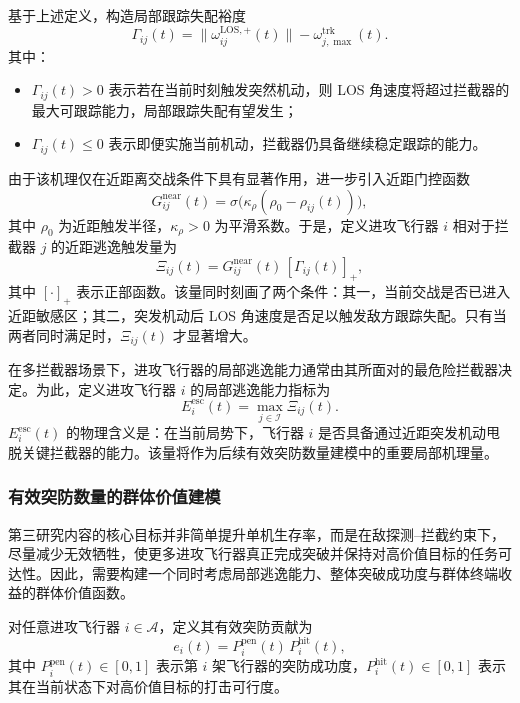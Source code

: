 基于上述定义，构造局部跟踪失配裕度
\begin{equation}
\Gamma_{ij}(t)
=
\|\omega_{ij}^{\mathrm{LOS},+}(t)\|
-
\omega_{j,\max}^{\mathrm{trk}}(t).
\end{equation}
其中：

\begin{itemize}
  \item $\Gamma_{ij}(t)>0$ 表示若在当前时刻触发突然机动，则 LOS 角速度将超过拦截器的最大可跟踪能力，局部跟踪失配有望发生；
  \item $\Gamma_{ij}(t)\le 0$ 表示即便实施当前机动，拦截器仍具备继续稳定跟踪的能力。
\end{itemize}

由于该机理仅在近距离交战条件下具有显著作用，进一步引入近距门控函数
\begin{equation}
G_{ij}^{\mathrm{near}}(t)
=
\sigma\!\bigl(\kappa_{\rho}(\rho_0-\rho_{ij}(t))\bigr),
\end{equation}
其中 $\rho_0$ 为近距触发半径，$\kappa_{\rho}>0$ 为平滑系数。于是，定义进攻飞行器 $i$ 相对于拦截器 $j$ 的近距逃逸触发量为
\begin{equation}
\Xi_{ij}(t)
=
G_{ij}^{\mathrm{near}}(t)\,[\Gamma_{ij}(t)]_+,
\end{equation}
其中 $[\cdot]_+$ 表示正部函数。该量同时刻画了两个条件：其一，当前交战是否已进入近距敏感区；其二，突发机动后 LOS 角速度是否足以触发敌方跟踪失配。只有当两者同时满足时，$\Xi_{ij}(t)$ 才显著增大。

在多拦截器场景下，进攻飞行器的局部逃逸能力通常由其所面对的最危险拦截器决定。为此，定义进攻飞行器 $i$ 的局部逃逸能力指标为
\begin{equation}
E_i^{\mathrm{esc}}(t)
=
\max_{j\in\mathcal{I}} \Xi_{ij}(t).
\end{equation}
$E_i^{\mathrm{esc}}(t)$ 的物理含义是：在当前局势下，飞行器 $i$ 是否具备通过近距突发机动甩脱关键拦截器的能力。该量将作为后续有效突防数量建模中的重要局部机理量。

\subsubsection{有效突防数量的群体价值建模}

第三研究内容的核心目标并非简单提升单机生存率，而是在敌探测--拦截约束下，尽量减少无效牺牲，使更多进攻飞行器真正完成突破并保持对高价值目标的任务可达性。因此，需要构建一个同时考虑局部逃逸能力、整体突破成功度与群体终端收益的群体价值函数。

对任意进攻飞行器 $i\in\mathcal{A}$，定义其有效突防贡献为
\begin{equation}
e_i(t)
=
P_i^{\mathrm{pen}}(t)\,P_i^{\mathrm{hit}}(t),
\end{equation}
其中 $P_i^{\mathrm{pen}}(t)\in[0,1]$ 表示第 $i$ 架飞行器的突防成功度，$P_i^{\mathrm{hit}}(t)\in[0,1]$ 表示其在当前状态下对高价值目标的打击可行度。

